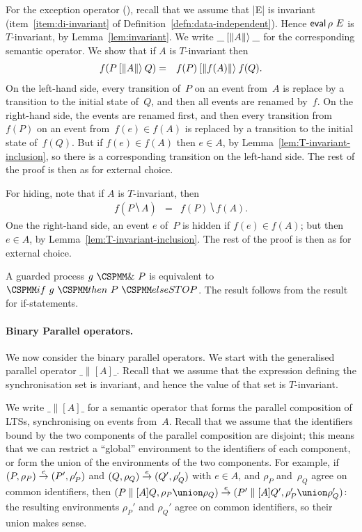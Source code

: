 For the exception operator (\CSPM{_ [\| E \|> _}), recall that we assume that
|E| is invariant (item~\ref{item:di-invariant} of
Definition~\ref{defn:data-independent}).  Hence $\mathop{\sf eval} \rho~E$ is
$T$-invariant, by Lemma~\ref{lem:invariant}.
%  
We write $\_ \mathbin{[\|A\|\rangle} \_$ for the corresponding semantic operator.  We show
that if $A$ is $T$-invariant then
\begin{eqnarray*}
f(P \mathbin{[\|A\|\rangle} Q) & = & f(P) \mathbin{[\|f(A)\|\rangle} f(Q).
\end{eqnarray*}
%
On the left-hand side, every transition of~$P$ on an event from~$A$ is replace
by a transition to the initial state of~$Q$, and then all events are renamed
by~$f$.  On the right-hand side, the events are renamed first, and then every
transition from $f(P)$ on an event from~$f(e) \in f(A)$ is replaced by a
transition to the initial state of~$f(Q)$.  But if $f(e) \in f(A)$ then $e \in
A$, by Lemma~\ref{lem:T-invariant-inclusion}, so there is a corresponding
transition on the left-hand side.  The rest of the proof is then as for
external choice.

For hiding, note that if $A$ is $T$-invariant, then
\begin{eqnarray*}
f(P \hide A) & = & f(P) \hide f(A).
\end{eqnarray*}
%
One the right-hand side, an event $e$ of~$P$ is hidden if $f(e) \in f(A)$; but
then $e \in A$, by Lemma~\ref{lem:T-invariant-inclusion}.  The rest of the
proof is then as for external choice.

A guarded process $g ~\M{\&}~ P$ is equivalent to $\M{if}~ g ~ \M{then}~
P ~ \M{else STOP}$.  The result follows from the result for if-statements.





\paragraph{Binary Parallel operators.}

We now consider the binary parallel operators.  We start with the generalised
parallel operator $\_ \parallel[A] \_$.  Recall that we assume that the
expression defining the synchronisation set is invariant, and hence the value
of that set is $T$-invariant.  

We write $\_ \parallel[A] \_$ for a semantic operator that forms the parallel
composition of LTSs, synchronising on events from~$A$.  Recall that we assume
that the identifiers bound by the two components of the parallel composition
are disjoint; this means that we can restrict a ``global'' environment to the
identifiers of each component, or form the union of the environments of the
two components.  For example, if $(P, \rho_P) \stackrel{e}{\rightarrow} (P', \rho_P')$ and
$(Q, \rho_Q) \stackrel{e}{\rightarrow} (Q',
\rho_Q')$ with $e \in A$, and $\rho_P$ and~$\rho_Q$ agree on common
identifiers, then $(P \parallel[A] Q, \rho_P \union \rho_Q) \trans{e} (P'
\parallel[A] Q', \rho_P' \union \rho_Q')$: the resulting environments
$\rho_P'$ and $\rho_Q'$ agree on common identifiers, so their union makes
sense.


